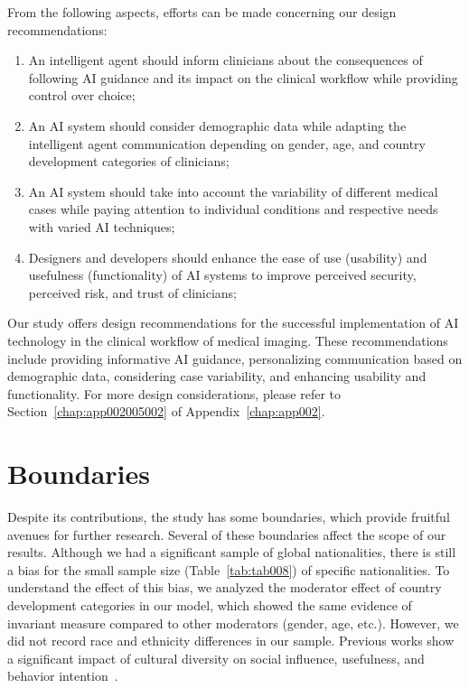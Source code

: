 \noindent
From the following aspects, efforts can be made concerning our design recommendations:

\vspace{0.50mm}

\begin{enumerate}
\item An intelligent agent should inform clinicians about the consequences of following \ac{AI} guidance and its impact on the clinical workflow while providing control over choice;
\item An \ac{AI} system should consider demographic data while adapting the intelligent agent communication depending on gender, age, and country development categories of clinicians;
\item An \ac{AI} system should take into account the variability of different medical cases while paying attention to individual conditions and respective needs with varied \ac{AI} techniques;
\item Designers and developers should enhance the ease of use (usability) and usefulness (functionality) of \ac{AI} systems to improve perceived security, perceived risk, and trust of clinicians;
\end{enumerate}

Our study offers design recommendations for the successful implementation of \ac{AI} technology in the clinical workflow of medical imaging.
These recommendations include providing informative \ac{AI} guidance, personalizing communication based on demographic data, considering case variability, and enhancing usability and functionality.
For more design considerations, please refer to Section~\ref{chap:app002005002} of Appendix~\ref{chap:app002}.

\section{Boundaries}
\label{sec:chap004007}

Despite its contributions, the study has some boundaries, which provide fruitful avenues for further research.
Several of these boundaries affect the scope of our results.
Although we had a significant sample of global nationalities, there is still a bias for the small sample size (Table~\ref{tab:tab008}) of specific nationalities.
To understand the effect of this bias, we analyzed the moderator effect of country development categories in our model, which showed the same evidence of invariant measure compared to other moderators (gender, age, etc.).
However, we did not record race and ethnicity differences in our sample.
Previous works show a significant impact of cultural diversity on social influence, usefulness, and behavior intention~\cite{Belanche2019, info:doi/10.2196/27122}.

